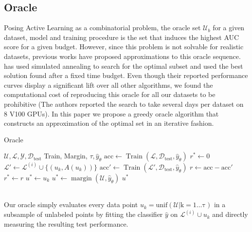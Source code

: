 \documentclass[]{article}
\begin{document}
\subsection{Oracle}\label{sec:oracle}
\begin{minipage}{0.5\linewidth}
	Posing Active Learning as a combinatorial problem, the oracle set $\mathcal{U}_b$ for a given dataset, model and training procedure is the set that induces the highest AUC score for a given budget.
	However, since this problem is not solvable for realistic datasets, previous works have proposed approximations to this oracle sequence. 
	\cite{zhou2021towards} has used simulated annealing to search for the optimal subset and used the best  solution found after a fixed time budget. 
	Even though their reported performance curves display a significant lift over all other algorithms, we found the computational cost of reproducing this oracle for all our datasets to be prohibitive (The authors reported the search to take several days per dataset on 8 V100 GPUs).
	In this paper we propose a greedy oracle algorithm that constructs an approximation of the optimal set in an iterative fashion.
\end{minipage}
\hspace{2mm}
\begin{minipage}{0.45\linewidth}
	\begin{algorithm}[H]
		\caption{Oracle}\label{alg:oracle}
		\begin{algorithmic}[1]
			\Require $\mathcal{U}, \mathcal{L}, \mathcal{Y}, \mathcal{D}_\text{test}$ Train, Margin, $\tau, \hat y_\theta$ 
			\State $\text{acc} \gets \operatorname{Train}(\mathcal{L}, \mathcal{D}_\text{test}, \hat y_\theta)$ 
			\State $r^* \gets 0$
			\State $\mathcal{L}' \gets \mathcal{L}^{(i)} \cup \{(u_k, A(u_k))\}$
			\State $\text{acc}' \gets \operatorname{Train}(\mathcal{L}', \mathcal{D}_\text{test}, \hat y_\theta)$  
			\State $r \gets \text{acc} - \text{acc}'$
			\State $r^* \gets r$
			\State $u^* \gets u_k$
			\EndIf
			\EndFor
			\State $u^* \gets \operatorname{margin}(\mathcal{U}, \hat y_\theta)$
			\EndIf
			\Return $u^*$
		\end{algorithmic}
	\end{algorithm}
\end{minipage} \\ [1mm]
Our oracle simply evaluates every data point $u_k = \operatorname{unif(\mathcal{U} | k = 1 \ldots \tau)}$ in a subsample of unlabeled points by fitting the classifier $\hat y$ on $\mathcal{L}^{(i)} \cup u_k$ and directly measuring the resulting test performance.
\end{document}
